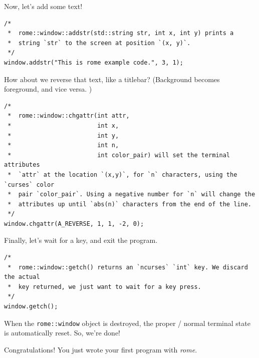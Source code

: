 \documentclass{article}
\begin{document}
	Now, let's add some text!

	\begin{lstlisting}
/*
 *  rome::window::addstr(std::string str, int x, int y) prints a
 *  string `str` to the screen at position `(x, y)`.
 */
window.addstr("This is rome example code.", 3, 1);
	\end{lstlisting}

	How about we reverse that text, like a titlebar? (Background becomes
	foreground, and vice versa. )

	\begin{lstlisting}
/*
 *  rome::window::chgattr(int attr,
 *  					  int x,
 *  					  int y,
 *  					  int n,
 *  					  int color_pair) will set the terminal attributes
 *  `attr` at the location `(x,y)`, for `n` characters, using the `curses` color
 *  pair `color_pair`. Using a negative number for `n` will change the
 *  attributes up until `abs(n)` characters from the end of the line.
 */
window.chgattr(A_REVERSE, 1, 1, -2, 0);
	\end{lstlisting}

	Finally, let's wait for a key, and exit the program.
	\begin{lstlisting}
/*
 *  rome::window::getch() returns an `ncurses` `int` key. We discard the actual
 *  key returned, we just want to wait for a key press.
 */
window.getch();
	\end{lstlisting}

	When the \texttt{rome::window} object is destroyed, the proper / normal
	terminal state is automatically reset. So, we're done!

	Congratulations! You just wrote your first program with \textit{rome}.
\end{document}
